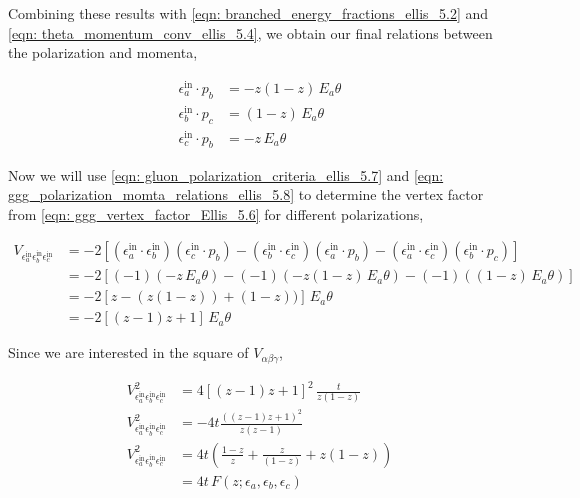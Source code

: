 \documentclass[main.tex]{subfiles}
\begin{document}
Combining these results with \autoref{eqn: branched_energy_fractions_ellis_5.2} and \autoref{eqn: theta_momentum_conv_ellis_5.4}, we obtain our final relations between the polarization and momenta, 

\begin{align}\label{eqn: ggg_polarization_momta_relations_ellis_5.8}
    \epsilon^{\text{in}}_a \cdot p_b &= -z(1-z)\, E_a \theta \nonumber \\
    \epsilon^{\text{in}}_b \cdot p_c &= (1-z)\, E_a \theta\\
    \epsilon^{\text{in}}_c \cdot p_b &= -z\, E_a \theta \nonumber
\end{align}

Now we will use \autoref{eqn: gluon_polarization_criteria_ellis_5.7} and \autoref{eqn: ggg_polarization_momta_relations_ellis_5.8} to determine the vertex factor from \autoref{eqn: ggg_vertex_factor_Ellis_5.6} for different polarizations, 

\begin{align}
    V_{\epsilon_a^\text{in} \epsilon_b^\text{in} \epsilon_c^\text{in}} &= -2 \left[
    (\epsilon_a^\text{in} \cdot \epsilon_b^\text{in})(\epsilon_c^\text{in} \cdot p_b) - 
    (\epsilon_b^\text{in} \cdot \epsilon_c^\text{in})(\epsilon_a^\text{in} \cdot p_b) -
    (\epsilon_a^\text{in} \cdot \epsilon_c^\text{in})(\epsilon_b^\text{in} \cdot p_c) 
    \right] \nonumber\\
    &= -2 \left[
    (-1)(-z\,E_a\theta) - (-1)(-z(1-z)\,E_a\theta) - (-1)((1-z)\, E_a\theta) 
    \right] \nonumber \\
    &= -2 \left[ z - (z(1-z)) + (1-z) ) \right] \,E_a\theta \nonumber \\
    &= -2 \left[ (z-1)z+ 1 \right] \,E_a\theta
\end{align}

Since we are interested in the square of \(V_{\alpha\beta\gamma}\),

\begin{align}
    V_{\epsilon_a^\text{in} \epsilon_b^\text{in} \epsilon_c^\text{in}}^2 &= 4 \left[ (z-1)z+ 1
    \right]^2 \,\frac{t}{z(1-z)} \nonumber\\
    V_{\epsilon_a^\text{in} \epsilon_b^\text{in} \epsilon_c^\text{in}}^2 &= -4 t 
    \frac{((z-1)z+ 1)^2}{z(z-1)} \nonumber \\
    V_{\epsilon_a^\text{in} \epsilon_b^\text{in} \epsilon_c^\text{in}}^2 &= 4 t 
    \left( \frac{1-z}{z} + \frac{z}{(1-z)} + z(1-z) \right) \nonumber \\
    &= 4t \, F(z;\epsilon_a,\epsilon_b,\epsilon_c)
\end{align}
\end{document}
